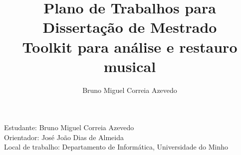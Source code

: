 \documentclass[runningheads,a4paper]{llncs}
\begin{document}
\mainmatter  %

\title{Plano de Trabalhos para Dissertação de Mestrado\\
Toolkit para análise e restauro musical
}


%
%
\author{Bruno Miguel Correia Azevedo}
%


%
%

\maketitle


Estudante: Bruno Miguel Correia Azevedo\\

Orientador: José João Dias de Almeida\\

Local de trabalho: Departamento de Informática, Universidade do Minho\\
\end{document}
